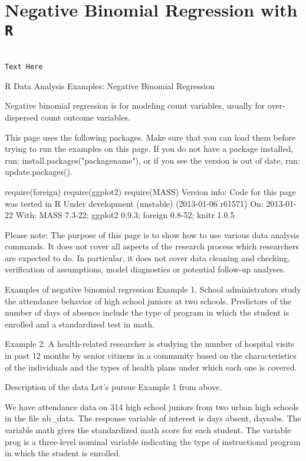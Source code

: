\documentclass[00-GLMregression.tex]{subfiles}
\begin{document}
	
\section{Negative Binomial Regression with \texttt{R}}

\begin{framed}
\begin{verbatim}

Text Here

\end{verbatim}	
\end{framed}


R Data Analysis Examples: Negative Binomial Regression

Negative binomial regression is for modeling count variables, usually for over-dispersed count outcome variables.

This page uses the following packages. Make sure that you can load them before trying to run the examples on this page. If you do not have a package installed, run: install.packages("packagename"), or if you see the version is out of date, run: update.packages().

require(foreign)
require(ggplot2)
require(MASS)
Version info: Code for this page was tested in R Under development (unstable) (2013-01-06 r61571)
On: 2013-01-22
With: MASS 7.3-22; ggplot2 0.9.3; foreign 0.8-52; knitr 1.0.5

Please note: The purpose of this page is to show how to use various data analysis commands. It does not cover all aspects of the research process which researchers are expected to do. In particular, it does not cover data cleaning and checking, verification of assumptions, model diagnostics or potential follow-up analyses.

Examples of negative binomial regression
Example 1. School administrators study the attendance behavior of high school juniors at two schools. Predictors of the number of days of absence include the type of program in which the student is enrolled and a standardized test in math.

Example 2. A health-related researcher is studying the number of hospital visits in past 12 months by senior citizens in a community based on the characteristics of the individuals and the types of health plans under which each one is covered.

Description of the data
Let's pursue Example 1 from above.

We have attendance data on 314 high school juniors from two urban high schools in the file nb_data. The response variable of interest is days absent, daysabs. The variable math gives the standardized math score for each student. The variable prog is a three-level nominal variable indicating the type of instructional program in which the student is enrolled.
\end{document}
